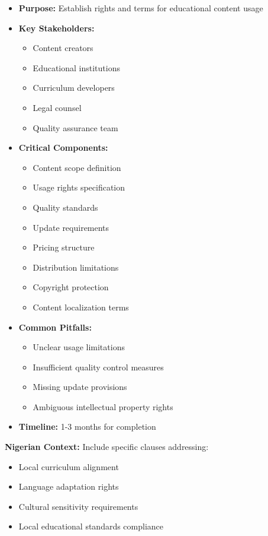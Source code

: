 \begin{tcolorbox}[colback=white,colframe=primarydark,title=\textbf{Educational Content Licensing}]
\begin{itemize}
    \item \textbf{Purpose:} Establish rights and terms for educational content usage
    \item \textbf{Key Stakeholders:}
    \begin{itemize}
        \item Content creators
        \item Educational institutions
        \item Curriculum developers
        \item Legal counsel
        \item Quality assurance team
    \end{itemize}
    \item \textbf{Critical Components:}
    \begin{itemize}
        \item Content scope definition
        \item Usage rights specification
        \item Quality standards
        \item Update requirements
        \item Pricing structure
        \item Distribution limitations
        \item Copyright protection
        \item Content localization terms
    \end{itemize}
    \item \textbf{Common Pitfalls:}
    \begin{itemize}
        \item Unclear usage limitations
        \item Insufficient quality control measures
        \item Missing update provisions
        \item Ambiguous intellectual property rights
    \end{itemize}
    \item \textbf{Timeline:} 1-3 months for completion
\end{itemize}

\textbf{Nigerian Context:}
Include specific clauses addressing:
\begin{itemize}
    \item Local curriculum alignment
    \item Language adaptation rights
    \item Cultural sensitivity requirements
    \item Local educational standards compliance
\end{itemize}
\end{tcolorbox}


